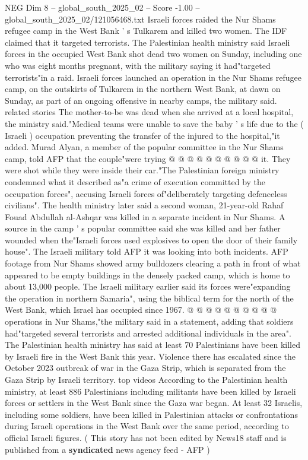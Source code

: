 \begin{textsample}{NEG Dim 8 – global\_south\_2025\_02 – Score -1.00 – global\_south\_2025\_02/121056468.txt}  \label{ex:f8_neg_368}
Israeli forces raided the Nur Shams refugee camp in the West Bank ' s Tulkarem and killed two women.
The IDF claimed that it targeted terrorists.
The Palestinian health ministry said Israeli forces in the occupied West Bank shot dead two women on Sunday, including one who was eight months pregnant, with the military saying it had"targeted terrorists"in a raid.
Israeli forces launched an operation in the Nur Shams refugee camp, on the outskirts of Tulkarem in the northern West Bank, at dawn on Sunday, as part of an ongoing offensive in nearby camps, the military said. related stories The mother-to-be was dead when she arrived at a local hospital, the ministry said."Medical teams were unable to save the baby ' s life due to the ( Israeli ) occupation preventing the transfer of the injured to the hospital,"it added.
Murad Alyan, a member of the popular committee in the Nur Shams camp, told AFP that the couple"were trying @ @ @ @ @ @ @ @ @ @ it.
They were shot while they were inside their car."The Palestinian foreign ministry condemned what it described as"a crime of execution committed by the occupation forces", accusing Israeli forces of"deliberately targeting defenceless civilians".
The health ministry later said a second woman, 21-year-old Rahaf Fouad Abdullah al-Ashqar was killed in a separate incident in Nur Shams.
A source in the camp ' s popular committee said she was killed and her father wounded when the"Israeli forces used explosives to open the door of their family house".
The Israeli military told AFP it was looking into both incidents.
AFP footage from Nur Shams showed army bulldozers clearing a path in front of what appeared to be empty buildings in the densely packed camp, which is home to about 13,000 people.
The Israeli military earlier said its forces were"expanding the operation in northern Samaria", using the biblical term for the north of the West Bank, which Israel has occupied since 1967. @ @ @ @ @ @ @ @ @ @ operations in Nur Shams,"the military said in a statement, adding that soldiers had"targeted several terrorists and arrested additional individuals in the area".
The Palestinian health ministry has said at least 70 Palestinians have been killed by Israeli fire in the West Bank this year.
Violence there has escalated since the October 2023 outbreak of war in the Gaza Strip, which is separated from the Gaza Strip by Israeli territory. top videos According to the Palestinian health ministry, at least 886 Palestinians including militants have been killed by Israeli forces or settlers in the West Bank since the Gaza war began.
At least 32 Israelis, including some soldiers, have been killed in Palestinian attacks or confrontations during Israeli operations in the West Bank over the same period, according to official Israeli figures. ( This story has not been edited by News18 staff and is published from a \textbf{syndicated} news agency feed - AFP )

\end{textsample}
